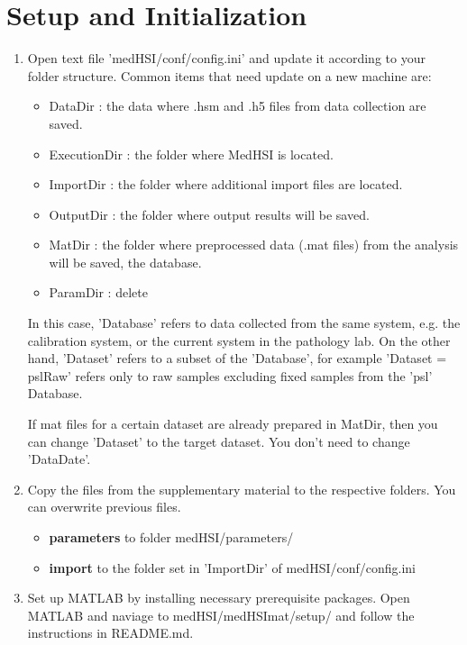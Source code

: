 \documentclass{foxelas_report}
\begin{document}
\section{Setup and Initialization} 
\begin{enumerate}

\item Open text file 'medHSI/conf/config.ini' and update it according to your folder structure. Common items that need update on a new machine are: 

\begin{itemize} 
\item DataDir : the data where .hsm and .h5 files from data collection are saved. 

\item ExecutionDir : the folder where MedHSI is located.

\item ImportDir : the folder where additional import files are located.

\item OutputDir : the folder where output results will be saved. 

\item MatDir : the folder where preprocessed data (.mat files) from the analysis will be saved, the database.

\item ParamDir : delete 

\end{itemize}

\par In this case, 'Database' refers to data collected from the same system, e.g. the calibration system, or the current system in the pathology lab. On the other hand, 'Dataset' refers to a subset of the 'Database', for example 'Dataset = pslRaw' refers only to raw samples excluding fixed samples from the 'psl' Database. 

\par If mat files for a certain dataset are already prepared in MatDir, then you can change 'Dataset' to the target dataset. You don't need to change 'DataDate'. 


\item Copy the files from the supplementary material to the respective folders. You can overwrite previous files. 

\begin{itemize}
\item \textbf{parameters} to folder medHSI/parameters/
\item \textbf{import} to the folder set in 'ImportDir' of medHSI/conf/config.ini
\end{itemize}


\item Set up MATLAB by installing necessary prerequisite packages. Open MATLAB and naviage to  medHSI/medHSImat/setup/ and follow the instructions in README.md. 

\end{enumerate}
\end{document}

